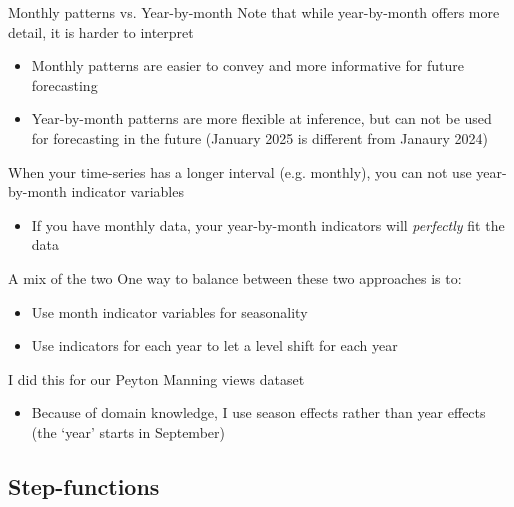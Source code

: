 \documentclass[aspectratio=169,t,11pt,table]{beamer}
\begin{document}
\begin{frame}{Monthly patterns vs. Year-by-month}
  Note that while year-by-month offers more detail, it is harder to interpret
  \begin{itemize}
    \item Monthly patterns are easier to convey and more informative for future forecasting
    \item Year-by-month patterns are more flexible at inference, but can not be used for forecasting in the future (January 2025 is different from Janaury 2024)
  \end{itemize}

  \pause
  \bigskip
  When your time-series has a longer interval (e.g. monthly), you can not use year-by-month indicator variables
  \begin{itemize}
    \item If you have monthly data, your year-by-month indicators will \emph{perfectly} fit the data
  \end{itemize}
\end{frame}

\begin{frame}{A mix of the two}
  One way to balance between these two approaches is to:
  \begin{itemize}
    \item Use month indicator variables for seasonality
    
    \item Use indicators for each year to let a level shift for each year
  \end{itemize}

  \bigskip
  I did this for our Peyton Manning views dataset
  \begin{itemize}
    \item Because of domain knowledge, I use season effects rather than year effects (the `year' starts in September)
  \end{itemize}
\end{frame}



\subsection{Step-functions}

\end{document}
